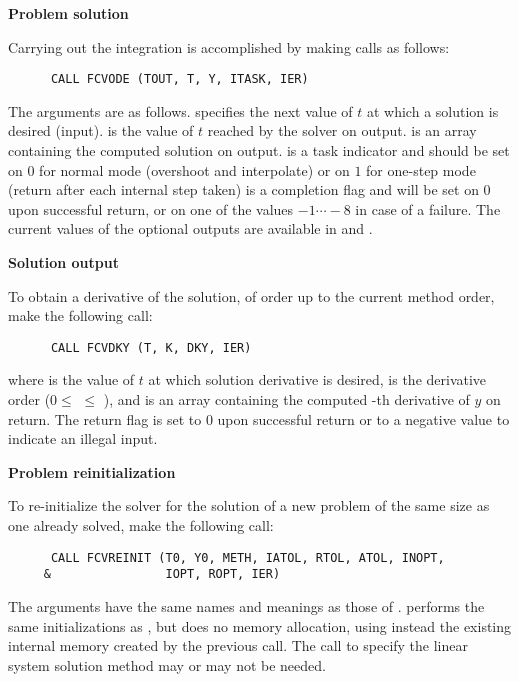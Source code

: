 \begin{Steps}
\item {\bf Problem solution}

  Carrying out the integration is accomplished by making calls as follows:
\begin{verbatim}
      CALL FCVODE (TOUT, T, Y, ITASK, IER)
\end{verbatim}
  The arguments are as follows.
   specifies the next value of $t$ at which a solution is desired (input).
   is the value of $t$ reached by the solver on output.
   is an array containing the computed solution on output.
   is a task indicator and should be set on $0$ for normal mode 
  (overshoot  and interpolate) or on $1$ for one-step mode 
  (return after each internal step taken)
   is a completion flag and will be set on $0$ upon successful return, or
  on one of the values $-1 \cdots -8$ in case of a failure.
  The current values of the optional outputs are available in  and .
  
\item {\bf Solution output}

  To obtain a derivative of the solution, of order up to the current method
  order, make the following call:
\begin{verbatim}
      CALL FCVDKY (T, K, DKY, IER)
\end{verbatim}
  where
   is the value of $t$ at which solution derivative is desired,
   is the derivative order ($0 \le$  $\le$ ), and
   is an array containing the computed -th derivative of $y$ on return.
  The return flag  is set to $0$ upon successful return or to a negative
  value to indicate an illegal input.
  
\item {\bf Problem reinitialization}

  To re-initialize the {\cvode} solver for the solution of a new problem
  of the same size as one already solved, make the following call:
\begin{verbatim}
      CALL FCVREINIT (T0, Y0, METH, IATOL, RTOL, ATOL, INOPT,
     &                IOPT, ROPT, IER)
\end{verbatim}
  The arguments have the same names and meanings as those of .
   performs the same initializations as
  , but does no memory allocation, using instead the existing
  internal memory created by the previous  call.  The call to
  specify the linear system solution method may or may not be needed.


\end{Steps}

